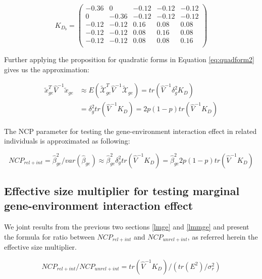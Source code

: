\documentclass[]{book}
\begin{document}
\begin{equation*} 
K_{D_b} = 
\left(\begin{array}{ccccc}
-0.36 & 0 & -0.12 & -0.12 & -0.12\\
0 & -0.36 & -0.12 & -0.12 & -0.12\\
-0.12 & -0.12 & 0.16 & 0.08 & 0.08\\
-0.12 & -0.12 & 0.08 & 0.16 & 0.08\\
-0.12 & -0.12 & 0.08 & 0.08 & 0.16\\
\end{array}\right)
\end{equation*}

Further applying the proposition for quadratic forms in Equation
\eqref{eq:quadform2} gives us the approximation:

\begin{equation}
\begin{split}
\tilde{x}_{ge}^T \hat{V}^{-1} \tilde{x}_{ge} & \approx E(\mathcal{\tilde{X}}_{ge}^T \hat{V}^{-1} \mathcal{\tilde{X}}_{ge}) = tr(\hat{V}^{-1} \delta_g^2 K_{D}) \\
& = \delta_g^2 tr(\hat{V}^{-1} K_{D}) = 2 p (1 - p) tr(\hat{V}^{-1} K_{D})
\end{split}
\label{eq:varbetahatlmmge}
\end{equation}

The NCP parameter for testing the gene-environment interaction effect in
related individuals is approximated as following:

\begin{equation}
NCP_{rel + int} = \hat{\beta}_{ge}^2 / var(\hat{\beta}_{ge}) \approx \hat{\beta}_{ge}^2 \delta_g^2 tr(\hat{V}^{-1} K_{D}) = \hat{\beta}_{ge}^2 2 p (1 - p) tr(\hat{V}^{-1} K_{D})
\label{eq:ncplmmge}
\end{equation}

\subsection{Effective size multiplier for testing marginal
gene-environment interaction effect}\label{trfge}

We joint results from the previous two sections \ref{lmge} and
\ref{lmmge} and present the formula for ratio between \(NCP_{rel+int}\)
and \(NCP_{unrel+int}\), as referred herein the effective size
multiplier.

\begin{equation}
NCP_{rel + int} / NCP_{unrel + int} = tr(\hat{V}^{-1} K_{D}) / (tr(E^2) / \sigma^2_r)
\label{eq:ncpratioge}
\end{equation}
\end{document}
